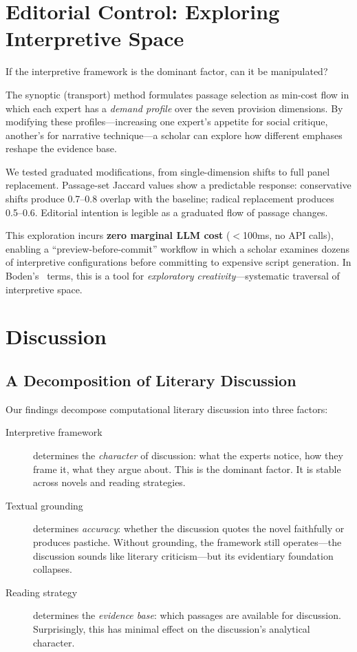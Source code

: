 \documentclass[final]{clv2025}
\begin{document}
\section{Editorial Control: Exploring Interpretive Space}
\label{sec:editorial}

If the interpretive framework is the dominant factor, can it be
manipulated?

The synoptic (transport) method formulates passage selection as min-cost
flow in which each expert has a \emph{demand profile} over the seven
provision dimensions.  By modifying these profiles---increasing one
expert's appetite for social critique, another's for narrative
technique---a scholar can explore how different emphases reshape the
evidence base.

We tested graduated modifications, from single-dimension shifts to full
panel replacement.  Passage-set Jaccard values show a predictable
response: conservative shifts produce 0.7--0.8 overlap with the
baseline; radical replacement produces 0.5--0.6.  Editorial intention
is legible as a graduated flow of passage changes.

This exploration incurs \textbf{zero marginal LLM cost} ($<$100ms, no
API calls), enabling a ``preview-before-commit'' workflow in which a
scholar examines dozens of interpretive configurations before
committing to expensive script generation.  In
Boden's~\cite{boden2004creative} terms, this is a tool for
\emph{exploratory creativity}---systematic traversal of interpretive
space.


\section{Discussion}
\label{sec:discussion}

\subsection{A Decomposition of Literary Discussion}

Our findings decompose computational literary discussion into three
factors:

\begin{description}
\item[Interpretive framework] determines the \emph{character} of
discussion: what the experts notice, how they frame it, what they argue
about.  This is the dominant factor.  It is stable across novels and
reading strategies.

\item[Textual grounding] determines \emph{accuracy}: whether the
discussion quotes the novel faithfully or produces pastiche.  Without
grounding, the framework still operates---the discussion sounds like
literary criticism---but its evidentiary foundation collapses.

\item[Reading strategy] determines the \emph{evidence base}: which
passages are available for discussion.  Surprisingly, this has minimal
effect on the discussion's analytical character.
\end{description}
\end{document}
